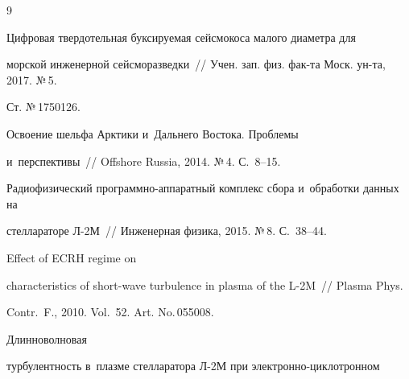 {\small\frenchspacing

{%


\begin{thebibliography}{9}




 Цифровая твердотельная буксируемая сейсмокоса малого диаметра для 

морской инженерной сейсморазведки~/\!\!/ Учен. зап. физ. фак-та Моск. ун-та, 2017. №\,5. 

Ст. №\,1750126.


 Освоение шельфа Арктики и~Дальнего Востока. Проблемы 

и~перспективы~/\!\!/ Offshore Russia, 2014. №\,4. С.~8--15.


 Радиофизический про\-грам\-мно-ап\-па\-рат\-ный комплекс сбора и~обработки данных на 

стеллараторе Л-2М~/\!\!/ Инженерная физика, 2015. №\,8. С.~38--44.




 Effect of ECRH regime on 

characteristics of short-wave turbulence in plasma of the L-2M~/\!\!/ Plasma Phys. 

Contr.~F., 2010. Vol.~52. Art. No.\,055008. 


 Длинноволновая 

турбулентность в~плазме стелларатора Л-2М при элект\-рон\-но-цик\-ло\-трон\-ном 


\end{thebibliography}}}
